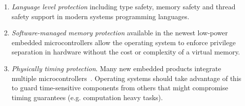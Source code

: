\begin{enumerate}
  \item \emph{Language level protection} including type safety, memory safety
    and thread safety support in modern systems programming languages.
  \item \emph{Software-managed memory protection} available in the newest
    low-power embedded microcontrollers allow the operating system to enforce
    privilege separation in hardware without the cost or complexity of a virtual
    memory.
  \item \emph{Physically timing protection}. Many new embedded products
    integrate multiple microcontrollers~.
  Operating systems should take advantage of this to guard time-sensitive
  components from others that might compromise timing guarantees (e.g.
  computation heavy tasks).
\end{enumerate}

